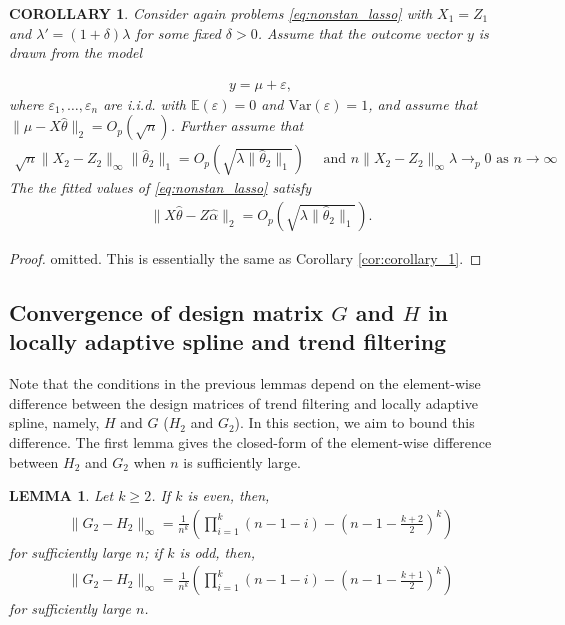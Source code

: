 \documentclass[a4paper]{article}
\newtheorem{lemma}{LEMMA}
\newtheorem{corollary}{COROLLARY}
\newcommand{\E}{\mathbb{E}}
\begin{document}
\begin{corollary}
Consider again problems \eqref{eq:nonstan_lasso} with $X_1 = Z_1$ and $\lambda' = (1+\delta)\lambda$ for some fixed $\delta > 0$. Assume that the outcome vector $y$ is drawn from the model

\begin{align*}
y = \mu + \varepsilon,
\end{align*}
where $\varepsilon_1,\ldots, \varepsilon_n$ are i.i.d. with $\E(\varepsilon) = 0$ and $\mbox{Var}(\varepsilon) = 1$, and assume that $\|\mu-X\hat{\theta}\|_2 = O_p(\sqrt{n})$. Further assume that
\begin{align*}
\sqrt{n}\|X_2-Z_2\|_\infty\|\hat{\theta}_2\|_1 = O_p(\sqrt{\lambda\|\hat{\theta}_2\|_1}) \quad \text{ and } n\|X_2-Z_2\|_\infty\lambda \rightarrow_p 0 \text{ as } n\rightarrow \infty
\end{align*}
The the fitted values of \eqref{eq:nonstan_lasso} satisfy 
\begin{align*}
\|X\hat{\theta} - Z\hat{\alpha}\|_2 = O_p(\sqrt{\lambda\|\hat{\theta}_2\|_1}).
\end{align*}
\label{cor:corollary_2}
\end{corollary}

\begin{proof}
omitted. This is essentially the same as Corollary \ref{cor:corollary_1}.
\end{proof}

\subsection{Convergence of design matrix $G$ and $H$ in locally adaptive spline and trend filtering}

Note that the conditions in the previous lemmas depend on the element-wise difference between the design matrices of trend filtering and locally adaptive spline, namely, $H$ and $G$ ($H_2$ and $G_2$). In this section, we aim to bound this difference. The first lemma gives the closed-form of the element-wise difference between $H_2$ and $G_2$ when $n$ is sufficiently large.

\begin{lemma}
Let $k\geq 2$. If $k$ is even, then,
\begin{align*}
\|G_2-H_2\|_\infty = \frac{1}{n^k}(\prod_{i=1}^k (n-1-i) - (n - 1- \frac{k+2}{2})^k)
\end{align*}
for sufficiently large $n$; if $k$ is odd, then,
\begin{align*}
\|G_2- H_2\|_\infty = \frac{1}{n^k}(\prod_{i=1}^k (n-1-i) - (n-1-\frac{k+1}{2})^k)
\end{align*}for sufficiently large $n$.
\label{lemma:lemma_diff}
\end{lemma}
\end{document}
